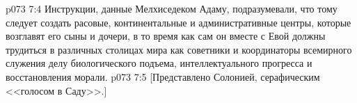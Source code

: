 \vs p073 7:4 Инструкции, данные Мелхиседеком Адаму, подразумевали, что тому следует создать расовые, континентальные и административные центры, которые возглавят его сыны и дочери, в то время как сам он вместе с Евой должны трудиться в различных столицах мира как советники и координаторы всемирного служения делу биологического подъема, интеллектуального прогресса и восстановления морали.
\vs p073 7:5 [Представлено Солонией, серафическим <<голосом в Саду>>.]
